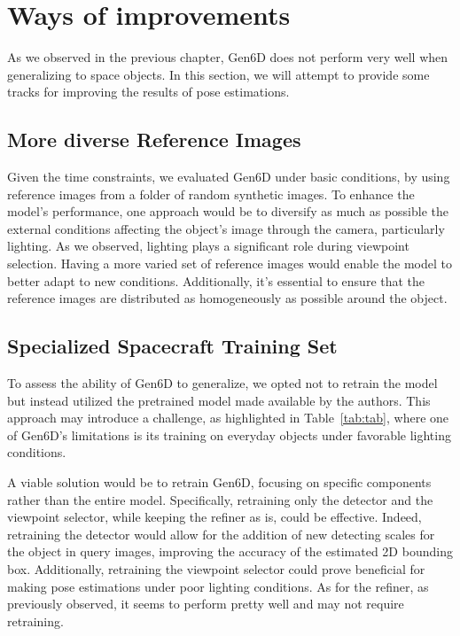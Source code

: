 
\chapter{Ways of improvements}\label{chapter:ways_of_improvements}

As we observed in the previous chapter, Gen6D does not perform very well when generalizing to space objects. In this section, we will attempt to provide some tracks for improving the results of pose estimations.

\section{More diverse Reference Images}

Given the time constraints, we evaluated Gen6D under basic conditions, by using reference images from a folder of random synthetic images. To enhance the model's performance, one approach would be to diversify as much as possible the external conditions affecting the object's image through the camera, particularly lighting. As we observed, lighting plays a significant role during viewpoint selection. Having a more varied set of reference images would enable the model to better adapt to new conditions. Additionally, it's essential to ensure that the reference images are distributed as homogeneously as possible around the object. 

\section{Specialized Spacecraft Training Set}

To assess the ability of Gen6D to generalize, we opted not to retrain the model but instead utilized the pretrained model made available by the authors. This approach may introduce a challenge, as highlighted in Table~\ref{tab:tab}, where one of Gen6D's limitations is its training on everyday objects under favorable lighting conditions.

A viable solution would be to retrain Gen6D, focusing on specific components rather than the entire model. Specifically, retraining only the detector and the viewpoint selector, while keeping the refiner as is, could be effective. Indeed, retraining the detector would allow for the addition of new detecting scales for the object in query images, improving the accuracy of the estimated 2D bounding box. Additionally, retraining the viewpoint selector could prove beneficial for making pose estimations under poor lighting conditions. As for the refiner, as previously observed, it seems to perform pretty well and may not require retraining.

